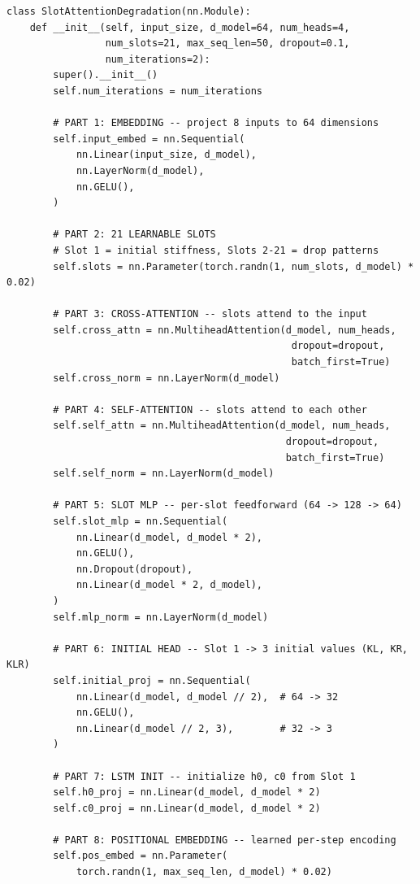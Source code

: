 \documentclass[11pt,a4paper]{article}
\begin{document}
\begin{lstlisting}
class SlotAttentionDegradation(nn.Module):
    def __init__(self, input_size, d_model=64, num_heads=4,
                 num_slots=21, max_seq_len=50, dropout=0.1,
                 num_iterations=2):
        super().__init__()
        self.num_iterations = num_iterations

        # PART 1: EMBEDDING -- project 8 inputs to 64 dimensions
        self.input_embed = nn.Sequential(
            nn.Linear(input_size, d_model),
            nn.LayerNorm(d_model),
            nn.GELU(),
        )

        # PART 2: 21 LEARNABLE SLOTS
        # Slot 1 = initial stiffness, Slots 2-21 = drop patterns
        self.slots = nn.Parameter(torch.randn(1, num_slots, d_model) * 0.02)

        # PART 3: CROSS-ATTENTION -- slots attend to the input
        self.cross_attn = nn.MultiheadAttention(d_model, num_heads,
                                                 dropout=dropout,
                                                 batch_first=True)
        self.cross_norm = nn.LayerNorm(d_model)

        # PART 4: SELF-ATTENTION -- slots attend to each other
        self.self_attn = nn.MultiheadAttention(d_model, num_heads,
                                                dropout=dropout,
                                                batch_first=True)
        self.self_norm = nn.LayerNorm(d_model)

        # PART 5: SLOT MLP -- per-slot feedforward (64 -> 128 -> 64)
        self.slot_mlp = nn.Sequential(
            nn.Linear(d_model, d_model * 2),
            nn.GELU(),
            nn.Dropout(dropout),
            nn.Linear(d_model * 2, d_model),
        )
        self.mlp_norm = nn.LayerNorm(d_model)

        # PART 6: INITIAL HEAD -- Slot 1 -> 3 initial values (KL, KR, KLR)
        self.initial_proj = nn.Sequential(
            nn.Linear(d_model, d_model // 2),  # 64 -> 32
            nn.GELU(),
            nn.Linear(d_model // 2, 3),        # 32 -> 3
        )

        # PART 7: LSTM INIT -- initialize h0, c0 from Slot 1
        self.h0_proj = nn.Linear(d_model, d_model * 2)
        self.c0_proj = nn.Linear(d_model, d_model * 2)

        # PART 8: POSITIONAL EMBEDDING -- learned per-step encoding
        self.pos_embed = nn.Parameter(
            torch.randn(1, max_seq_len, d_model) * 0.02)


\end{lstlisting}
\end{document}
